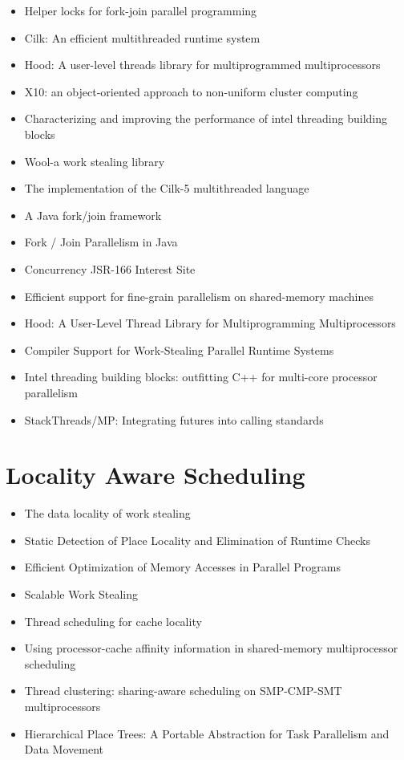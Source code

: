 \begin{itemize}
\item Helper locks for fork-join parallel programming
  \cite{Agrawal2010}
\item Cilk: An efficient multithreaded runtime system
  \cite{Blumofe1995}
\item Hood: A user-level threads library for multiprogrammed
  multiprocessors \cite{Blumofe1998}
\item X10: an object-oriented approach to non-uniform cluster
  computing \cite{Charles2005}
\item Characterizing and improving the performance of intel threading
  building blocks \cite{Contreras2008}
\item Wool-a work stealing library \cite{Faxen2009}
\item The implementation of the Cilk-5 multithreaded language
  \cite{Frigo1998}
\item A Java fork/join framework \cite{Lea2000}
\item Fork / Join Parallelism in Java \cite{Lea2000a}
\item Concurrency JSR-166 Interest Site \cite{Lea}
\item Efficient support for fine-grain parallelism on shared-memory
  machines \cite{Lowenthal1998}
\item Hood: A User-Level Thread Library for Multiprogramming
  Multiprocessors \cite{Papadopoulos1998}
\item Compiler Support for Work-Stealing Parallel Runtime Systems
  \cite{Raman2009}
\item Intel threading building blocks: outfitting C++ for multi-core
  processor parallelism \cite{Reinders2007}
\item StackThreads/MP: Integrating futures into calling standards
  \cite{Taura1999}
\end{itemize}


\section{Locality Aware Scheduling}
\label{sec:lr-locality-aware-scheduling}

\begin{itemize}
\item The data locality of work stealing \cite{Acar2002}
\item Static Detection of Place Locality and Elimination of Runtime
  Checks \cite{Agarwal2008}
\item Efficient Optimization of Memory Accesses in Parallel Programs
  \cite{Barik2009}
\item Scalable Work Stealing \cite{Dinan2009}
\item Thread scheduling for cache locality \cite{Philbin1996}
\item Using processor-cache affinity information in shared-memory
  multiprocessor scheduling \cite{Squillante1993}
\item Thread clustering: sharing-aware scheduling on SMP-CMP-SMT
  multiprocessors \cite{Tam2007}
\item Hierarchical Place Trees: A Portable Abstraction for Task
  Parallelism and Data Movement \cite{Yan2009}
\end{itemize}


